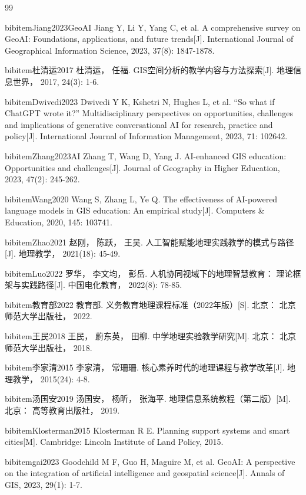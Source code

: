 \documentclass[12pt, a4paper]{article}
\begin{document}
\begin{thebibliography}{99}
\addtolength{\itemsep}{-0.5\baselineskip}

bibitem{Jiang2023GeoAI}
Jiang Y, Li Y, Yang C, et al. A comprehensive survey on GeoAI: Foundations, applications, and future trends[J]. International Journal of Geographical Information Science, 2023, 37(8): 1847-1878.

bibitem{杜清运2017}
杜清运， 任福. GIS空间分析的教学内容与方法探索[J]. 地理信息世界， 2017, 24(3): 1-6.

bibitem{Dwivedi2023}
Dwivedi Y K, Kshetri N, Hughes L, et al. ``So what if ChatGPT wrote it?'' Multidisciplinary perspectives on opportunities, challenges and implications of generative conversational AI for research, practice and policy[J]. International Journal of Information Management, 2023, 71: 102642.

bibitem{Zhang2023AI}
Zhang T, Wang D, Yang J. AI-enhanced GIS education: Opportunities and challenges[J]. Journal of Geography in Higher Education, 2023, 47(2): 245-262.

bibitem{Wang2020}
Wang S, Zhang L, Ye Q. The effectiveness of AI-powered language models in GIS education: An empirical study[J]. Computers \& Education, 2020, 145: 103741.

bibitem{Zhao2021}
赵刚， 陈跃， 王吴. 人工智能赋能地理实践教学的模式与路径[J]. 地理教学， 2021(18): 45-49.

bibitem{Luo2022}
罗华， 李文均， 彭岳. 人机协同视域下的地理智慧教育： 理论框架与实践路径[J]. 中国电化教育， 2022(8): 78-85.

bibitem{教育部2022}
教育部. 义务教育地理课程标准（2022年版）[S]. 北京： 北京师范大学出版社， 2022.

bibitem{王民2018}
王民， 蔚东英， 田柳. 中学地理实验教学研究[M]. 北京： 北京师范大学出版社， 2018.

bibitem{李家清2015}
李家清， 常珊珊. 核心素养时代的地理课程与教学改革[J]. 地理教学， 2015(24): 4-8.

bibitem{汤国安2019}
汤国安， 杨昕， 张海平. 地理信息系统教程（第二版）[M]. 北京： 高等教育出版社， 2019.

bibitem{Klosterman2015}
Klosterman R E. Planning support systems and smart cities[M]. Cambridge: Lincoln Institute of Land Policy, 2015.

bibitem{gai2023}
Goodchild M F, Guo H, Maguire M, et al. GeoAI: A perspective on the integration of artificial intelligence and geospatial science[J]. Annals of GIS, 2023, 29(1): 1-7.


\end{thebibliography}
\end{document}
